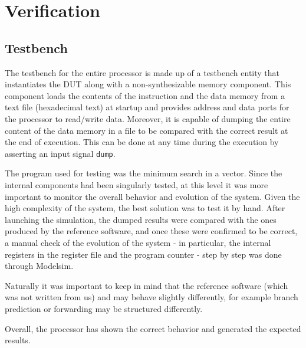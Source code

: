 \chapter{Verification}



\newpage

\section{Testbench}
The testbench for the entire processor is made up of a testbench entity that instantiates the DUT along with a non-synthesizable memory component. This component loads the contents of the instruction and the data memory from a text file (hexadecimal text) at startup and provides address and data ports for the processor to read/write data. Moreover, it is capable of dumping the entire content of the data memory in a file to be compared with the correct result at the end of execution. This can be done at any time during the execution by asserting an input signal \texttt{dump}.

The program used for testing was the minimum search in a vector. Since the internal components had been singularly
tested, at this level it was more important to monitor the overall behavior and evolution of the system. Given the
high complexity of the system, the best solution was to test it by hand. After launching the simulation, the
dumped results were compared with the ones produced by the reference software, and once these were confirmed to be
correct, a manual check of the evolution of the system - in particular, the internal registers in the register file
and the program counter - step by step was done through Modelsim.

Naturally it was important to keep in mind that the reference software (which was not written from us) and may behave
slightly differently, for example branch prediction or forwarding may be structured differently.

Overall, the processor has shown the correct behavior and generated the expected results.

